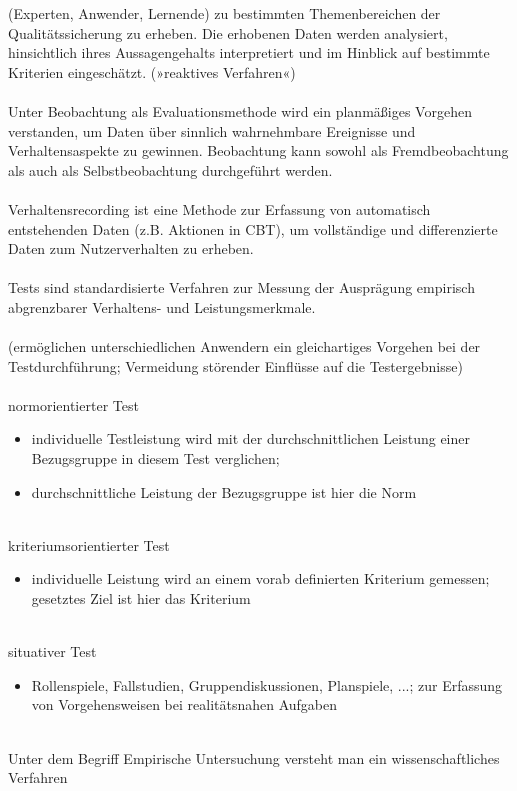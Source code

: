 \documentclass[a4paper]{article}
\begin{document}
(Experten, Anwender, Lernende) zu bestimmten Themenbereichen der Qualitätssicherung zu
erheben. Die erhobenen Daten werden analysiert, hinsichtlich ihres Aussagengehalts interpretiert
und im Hinblick auf bestimmte Kriterien eingeschätzt. (»reaktives Verfahren«)
~\\~\\
Unter Beobachtung als Evaluationsmethode wird ein planmäßiges Vorgehen verstanden, um
Daten über sinnlich wahrnehmbare Ereignisse und Verhaltensaspekte zu gewinnen. Beobachtung
kann sowohl als Fremdbeobachtung als auch als Selbstbeobachtung durchgeführt werden.
~\\~\\
Verhaltensrecording ist eine Methode zur Erfassung von automatisch entstehenden Daten
(z.B. Aktionen in CBT), um vollständige und differenzierte Daten zum Nutzerverhalten zu
erheben.
~\\~\\
Tests sind standardisierte Verfahren zur Messung der Ausprägung empirisch abgrenzbarer
Verhaltens- und Leistungsmerkmale.
~\\~\\
(ermöglichen unterschiedlichen Anwendern ein gleichartiges Vorgehen bei der
Testdurchführung; Vermeidung störender Einflüsse auf die Testergebnisse)
~\\~\\
normorientierter Test
\begin{itemize}
	\item individuelle Testleistung wird mit der durchschnittlichen Leistung einer Bezugsgruppe in
	diesem Test verglichen;
	\item durchschnittliche Leistung der Bezugsgruppe ist hier die Norm
\end{itemize}
~\\
kriteriumsorientierter Test
\begin{itemize}
	\item individuelle Leistung wird an einem vorab definierten Kriterium
	gemessen; gesetztes Ziel ist hier das Kriterium
\end{itemize}
~\\
situativer Test
\begin{itemize}
	\item Rollenspiele, Fallstudien, Gruppendiskussionen, Planspiele,
	...; zur Erfassung von Vorgehensweisen bei realitätsnahen
	Aufgaben
\end{itemize}
~\\
Unter dem Begriff Empirische Untersuchung versteht man ein wissenschaftliches Verfahren
\end{document}
